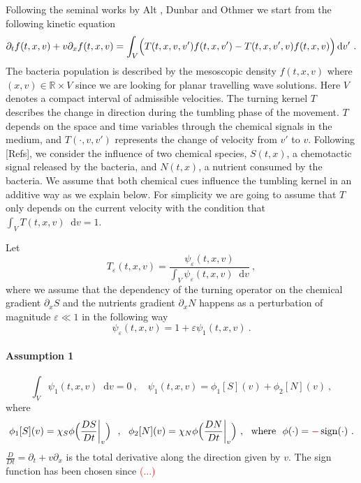 \documentclass[11pt,twoside]{article}
\newcommand*\diff{\mathop{}\!\mathrm{d}}
\DeclareMathOperator{\sign}{sign}
\numberwithin{equation}{section}
\begin{document}
Following the seminal works by Alt \cite{alt1980biased}, Dunbar and Othmer \cite{othmer1988models}  we start from the following kinetic equation 
\begin{equation}
    \partial_t f(t,x,v)+{v}\partial_x f(t,x,v)= \int_{V}\Bigl(T(t,x,v,v')f(t,x,v')-  T(t,x,{v}',v)f(t,x,v)\Bigr)\diff v'\ .\label{eq: main kinetic}
\end{equation}
The bacteria population is described by the mesoscopic density $f(t,x,v)$ where $(x,v)\in\mathbb{R}\times V$ since we are looking for planar travelling wave solutions. Here $V$ denotes a compact interval of admissible velocities. The turning kernel $T$ describes the change in direction during the tumbling phase of the movement. $T$ depends on the space and time variables through the chemical signals in the medium,  and $T(\cdot, v,v')$ represents the change of velocity from $v'$ to $v$. Following [Refs], we consider the influence of two chemical species, $S(t,x)$, a chemotactic signal released by the bacteria, and $N(t,x)$, a nutrient consumed by the bacteria. We assume that both chemical cues influence the tumbling kernel in an additive way as we explain below. For simplicity we are going to assume that $T$ only depends on the current velocity with the condition that $\int_VT(t,x,v)\diff v=1$.

Let 
\begin{equation}\label{TepsFeps}
    T_\varepsilon(t,x,v)=\frac{\psi_\varepsilon(t,x,{v}) }{\displaystyle\int_{V}\psi_\varepsilon(t,x,{v})  \diff {v}}\ ,
\end{equation}
where we assume that the dependency of the turning operator on the chemical gradient $\partial_x S$ and the nutrients gradient $\partial_x N$ happens as a perturbation of magnitude $\varepsilon\ll 1$ in the following way
\begin{equation}\label{expansion_psi}
    \psi_\varepsilon(t,x,{v})=1+\varepsilon\psi_1(t,x,{v})\ .
\end{equation}
\paragraph{Assumption 1}
\begin{equation}\tag{A1}
\int_V\psi_1(t,x,{v})\diff {v}=0\ , \quad \psi_1(t,x,{v}) = \phi_1[S]({v}) + \phi_2[N]({v})\ , \label{hypo2}
\end{equation}
where
$$\phi_1[S]({v})=\chi_S\phi\Bigl(\frac{DS}{Dt}\bigg\rvert_{v}\Bigr)\ \ ,\ \ \phi_2[N](v)= \chi_N\phi\Bigl(\frac{DN}{Dt}\bigg\rvert_{v}\Bigr)\ ,\ \ \textnormal{where}\ \ \phi(\cdot)=\textcolor{red}{-}\sign(\cdot)\ .$$
 $\frac{D}{Dt}=\partial_t+{v}\partial_x$ is the total derivative along the direction given by ${v}$. The sign function has been chosen since \textcolor{red}{(...)}
\end{document}
